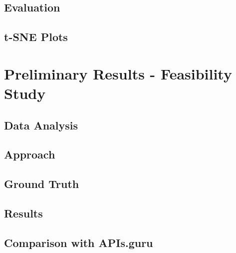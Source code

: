 \documentclass{layout/si-msc-proposal}
\begin{document}
    \subsection{Evaluation}\label{subsec:evaluation}
    

    \subsection{{t}-SNE Plots}\label{subsec:t-sne-plots}
    


    \section{Preliminary Results - Feasibility Study}\label{sec:preliminary-results---feasibility-study}
    

    \subsection{Data Analysis}\label{subsec:data-analysis}
    

    \subsection{Approach}\label{subsec:approach}
    

    \subsection{Ground Truth}\label{subsec:ground-truth}
    

    \subsection{Results}\label{subsec:results}
    

    \subsection{Comparison with APIs.guru}\label{subsec:comparison-with-apis.guru}
    
\end{document}
